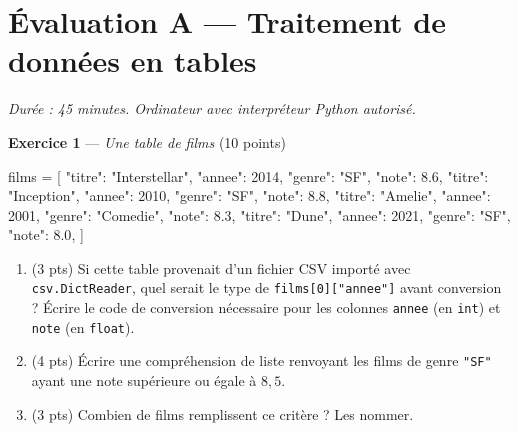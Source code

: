 \section*{Évaluation A --- Traitement de données en tables}
\textit{Durée : 45 minutes. Ordinateur avec interpréteur Python autorisé.}


\bigskip

\textbf{Exercice 1} --- \textit{Une table de films} \hfill (10 points)

\begin{python}
films = [
    {"titre": "Interstellar", "annee": 2014, "genre": "SF", "note": 8.6},
    {"titre": "Inception", "annee": 2010, "genre": "SF", "note": 8.8},
    {"titre": "Amelie", "annee": 2001, "genre": "Comedie", "note": 8.3},
    {"titre": "Dune", "annee": 2021, "genre": "SF", "note": 8.0},
]
\end{python}

\begin{enumerate}
  \item (3 pts) Si cette table provenait d'un fichier CSV importé avec \lstinline{csv.DictReader}, quel serait le type de \lstinline{films[0]["annee"]} avant conversion ? Écrire le code de conversion nécessaire pour les colonnes \lstinline{annee} (en \lstinline{int}) et \lstinline{note} (en \lstinline{float}).
  \item (4 pts) Écrire une compréhension de liste renvoyant les films de genre \lstinline{"SF"} ayant une note supérieure ou égale à $8{,}5$.
  \item (3 pts) Combien de films remplissent ce critère ? Les nommer.
\end{enumerate}


